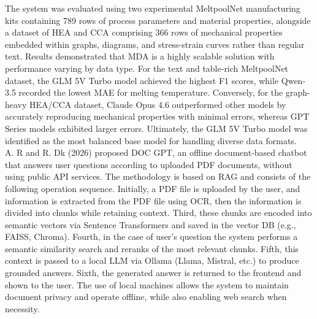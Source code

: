 \documentclass[11pt,a4paper]{report}
\begin{document}
The system was evaluated using two experimental MeltpoolNet manufacturing kits containing 789 rows of process parameters and material properties, alongside a dataset of \ac{HEA} and \ac{CCA} comprising 366 rows of mechanical properties embedded within graphs, diagrams, and stress-strain curves rather than regular text. Results demonstrated that \ac{MDA} is a highly scalable solution with performance varying by data type. For the text and table-rich MeltpoolNet dataset, the GLM 5V Turbo model achieved the highest F1 scores, while Qwen-3.5 recorded the lowest \ac{MAE} for melting temperature. Conversely, for the graph-heavy \ac{HEA}/\ac{CCA} dataset, Claude Opus 4.6 outperformed other models by accurately reproducing mechanical properties with minimal errors, whereas GPT Series models exhibited larger errors. Ultimately, the GLM 5V Turbo model was identified as the most balanced base model for handling diverse data formats.\\

A. R and R. Dk \cite{R2026DOCGA} (2026) proposed DOC GPT, an offline document-based chatbot that answers user questions according to uploaded \ac{PDF} documents, without using public \ac{API} services. The methodology is based on \ac{RAG} and consists of the following operation sequence. Initially, a \ac{PDF} file is uploaded by the user, and information is extracted from the \ac{PDF} file using \ac{OCR}, then the information is divided into chunks while retaining context. Third, these chunks are encoded into semantic vectors via Sentence Transformers and saved in the vector DB (e.g., \ac{FAISS}, Chroma). Fourth, in the case of user's question the system performs a semantic similarity search and reranks of the most relevant chunks. Fifth, this context is passed to a local \ac{LLM} via Ollama (Llama, Mistral, etc.) to produce grounded answers. Sixth, the generated answer is returned to the frontend and shown to the user. The use of local machines allows the system to maintain document privacy and operate offline, while also enabling web search when necessity.\\
\end{document}
